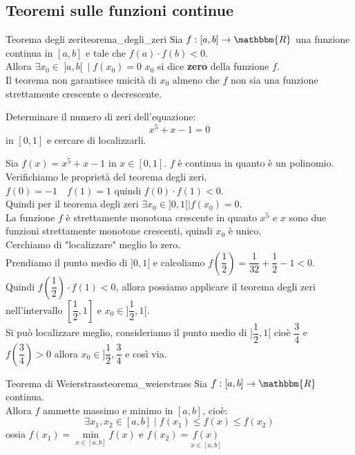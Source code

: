 \documentclass[12pt]{report}
\newcounter{theorem}
\newcounter{exercise}
\newcommand{\nmu}{}
\begin{document}
 	\subsection{Teoremi sulle funzioni continue}
 	\begin{theorem}{\nmu Teorema degli zeri}{teorema_degli_zeri}
 		Sia $f: [a, b] \to \mathbbm{R}$ una funzione continua in $[a, b]$ e tale che $f(a) \cdot f(b) < 0$. \\
 		Allora $\exists x_0 \in\ ]a, b[\ \mid f(x_0) = 0$ $x_0$ si dice \textbf{zero} della funzione $f$.\\
 		Il teorema non garantisce unicità di $x_0$ almeno che $f$ non sia una funzione strettamente crescente o decrescente.
 	\end{theorem}
 	\begin{assignment}{}{}
 		Determinare il numero di zeri dell'equazione:
 		\[
 		x^5 + x - 1 = 0
 		\]
 		in $[0, 1]$ e cercare di localizzarli. \\
 		\begin{exercise}{}{}
			 Sia $f(x) = x^5 + x - 1$ in $x \in [0, 1]$. $f$ è continua in quanto è un polinomio. \\
			 Verifichiamo le proprietà del teorema degli zeri. \\
			 $f(0) = -1 \quad f(1) = 1$ quindi $f(0) \cdot f(1) < 0$. \\
			 Quindi per il teorema degli zeri $\exists x_0 \in ]0, 1[ \mid f(x_0) = 0$. \\
			 La funzione $f$ è strettamente monotona crescente in quanto $x^5$ e $x$ sono due funzioni strettamente monotone crescenti, quindi $x_0$ è unico. \\
			 Cerchiamo di "localizzare" meglio lo zero. \\
			 Prendiamo il punto medio di $]0, 1[$ e calcoliamo $f(\dfrac{1}{2}) = \dfrac{1}{32} + \dfrac{1}{2} - 1 < 0$. \\
			 Quindi $f(\dfrac{1}{2}) \cdot f(1) < 0$, allora possiamo applicare il teorema degli zeri nell'intervallo $[\dfrac{1}{2}, 1]$ e $x_0 \in ]\dfrac{1}{2}, 1[$. \\
			 Si può localizzare meglio, consideriamo il punto medio di $]\dfrac{1}{2}, 1[$ cioè $\dfrac{3}{4}$ e $f(\dfrac{3}{4}) > 0$ allora $x_0 \in ]\dfrac{1}{2}, \dfrac{3}{4}$ e così via.
 		\end{exercise}
 	\end{assignment}
 	\begin{theorem}{\nmu Teorema di Weierstrass}{teorema_weierstrass}
 		Sia $f: [a, b] \to \mathbbm{R}$ continua. \\
 		Allora $f$ ammette massimo e minimo in $[a, b]$, cioè:
 		\[
 		\exists x_1, x_2 \in [a, b] \mid f(x_1) \leq f(x) \leq f(x_2)
  		\]
  		ossia $f(x_1) = \underset{x \in [a, b]}{\min} f(x)$ e $f(x_2) = \underset{x \in [a, b]}{f(x)}$
 	\end{theorem}
\end{document}
